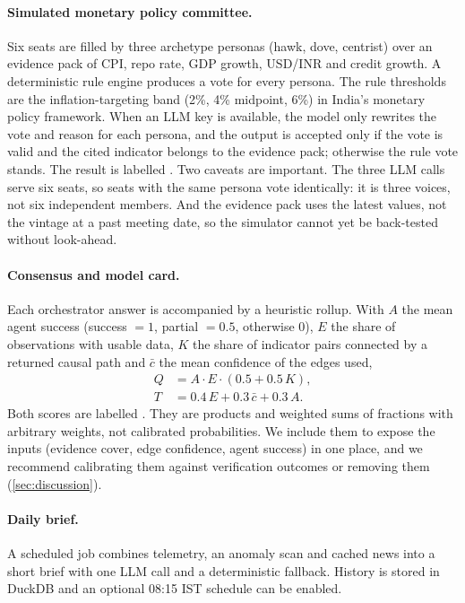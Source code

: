 \documentclass[conference]{IEEEtran}
\newcommand{\code}[1]{\texttt{\detokenize{#1}}}
\begin{document}
\paragraph{Simulated monetary policy committee.}
Six seats are filled by three archetype personas (hawk, dove, centrist) over an evidence pack of CPI, repo rate, GDP growth, USD/INR and credit growth. A deterministic rule engine produces a vote for every persona. The rule thresholds are the inflation-targeting band (2\%, 4\% midpoint, 6\%) in India's monetary policy framework. When an LLM key is available, the model only rewrites the vote and reason for each persona, and the output is accepted only if the vote is valid and the cited indicator belongs to the evidence pack; otherwise the rule vote stands. The result is labelled \code{SIMULATED}. Two caveats are important. The three LLM calls serve six seats, so seats with the same persona vote identically: it is three voices, not six independent members. And the evidence pack uses the latest values, not the vintage at a past meeting date, so the simulator cannot yet be back-tested without look-ahead.

\paragraph{Consensus and model card.}
Each orchestrator answer is accompanied by a heuristic rollup. With $A$ the mean agent success (success $=1$, partial $=0.5$, otherwise $0$), $E$ the share of observations with usable data, $K$ the share of indicator pairs connected by a returned causal path and $\bar c$ the mean confidence of the edges used,
\begin{align}
Q &= A\cdot E\cdot(0.5+0.5\,K), \label{eq:consensus}\\
T &= 0.4\,E + 0.3\,\bar c + 0.3\,A. \label{eq:trust}
\end{align}
Both scores are labelled \code{heuristic}. They are products and weighted sums of fractions with arbitrary weights, not calibrated probabilities. We include them to expose the inputs (evidence cover, edge confidence, agent success) in one place, and we recommend calibrating them against verification outcomes or removing them (\cref{sec:discussion}).

\paragraph{Daily brief.}
A scheduled job combines telemetry, an anomaly scan and cached news into a short brief with one LLM call and a deterministic fallback. History is stored in DuckDB and an optional 08:15 IST schedule can be enabled.
\end{document}
